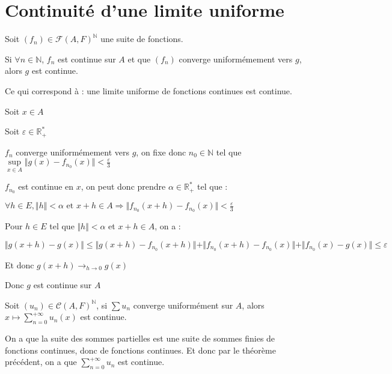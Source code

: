 \documentclass[a4paper,12pt]{book}
\newcommand{\Thr}[2]{\begin{tcolorbox}[sharp corners, colback=white,colframe=red!90!black!75, title=Théorème : #1]#2\end{tcolorbox}}
\newcommand{\Pre}[1]{\begin{tcolorbox}[sharp corners, colback=white,colframe=green!60!green!30!black!75, title=Preuve]#1\end{tcolorbox}}
\def\R{\mathbb{R}}
\def\N{\mathbb{N}}
\begin{document}
\section{Continuité d'une limite uniforme}
\Thr{Continuité uniforme}{Soit $(f_n)\in\mathcal{F}(A,F)^\N$ une suite de fonctions.
\par Si $\forall n\in\N$, $f_n$ est continue sur $A$ et que $(f_n)$ converge uniformémement vers $g$, alors $g$ est continue.
\par Ce qui correspond à : une limite uniforme de fonctions continues est continue.}
\Pre{Soit $x\in A$ \par Soit $\varepsilon\in\R_+^*$\par $f_n$ converge uniformémement vers $g$, on fixe donc $n_0\in\N$ tel que $\sup\limits_{x\in A}\Vert g(x)-f_{n_0}(x)\Vert<\frac{\varepsilon}{3}$ \par $f_{n_0}$ est continue en $x$, on peut donc prendre $\alpha\in\R_+^*$ tel que :\par $\forall h\in E, \Vert h\Vert <\alpha \text{ et } x+h\in A \Rightarrow \Vert f_{n_0}(x+h)-f_{n_0}(x)\Vert<\frac{\varepsilon}{3}$
\par Pour $h\in E$ tel que $\Vert h\Vert<\alpha$ et $x+h\in A$, on a :\par $\Vert g(x+h) - g(x)\Vert\leq\Vert g(x+h)-f_{n_0}(x+h)\Vert + \Vert f_{n_0}(x+h) -f_{n_0}(x) \Vert +\Vert f_{n_0}(x)-g(x)\Vert \leq \varepsilon$ \par Et donc $g(x+h)\to_{h\to 0} g(x)$ \par Donc $g$ est continue sur $A$}
\Thr{Application aux séries de fonctions}{Soit $(u_n)\in \mathcal{C}(A,F)^\N$, si $\sum u_n$ converge uniformément sur $A$, alors $x\mapsto\sum\limits_{n=0}^{+\infty}u_n(x)$ est continue.}
\Pre{On a que la suite des sommes partielles est une suite de sommes finies de fonctions continues, donc de fonctions continues. Et donc par le théorème précédent, on a que $\sum\limits_{n=0}^{+\infty}u_n$ est continue.}
\end{document}

